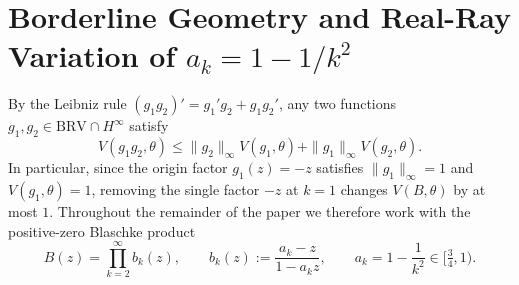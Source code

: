 \documentclass[11pt,reqno]{amsart}
\numberwithin{equation}{section}
\newcommand{\BRV}{\mathrm{BRV}}
\begin{document}
\section{Borderline Geometry and Real-Ray Variation of $a_k = 1 - 1/k^2$} \label{sec_borderline}

By the Leibniz rule $(g_1 g_2)' = g_1' g_2 + g_1 g_2'$, any two functions $g_1, g_2 \in \BRV \cap H^\infty$ satisfy
\begin{equation} \label{eq_brv_algebra}
  V(g_1 g_2, \theta) \le \|g_2\|_\infty V(g_1, \theta) + \|g_1\|_\infty V(g_2, \theta).
\end{equation}
In particular, since the origin factor $g_1(z) = -z$ satisfies $\|g_1\|_\infty = 1$ and $V(g_1, \theta) = 1$, removing the single factor $-z$ at $k = 1$ changes $V(B, \theta)$ by at most $1$. Throughout the remainder of the paper we therefore work with the positive-zero Blaschke product
\begin{equation} \label{eq_B_tail}
  B(z) = \prod_{k=2}^\infty b_k(z), \qquad b_k(z) := \frac{a_k - z}{1 - a_k z}, \qquad a_k = 1 - \frac{1}{k^2} \in \bigl[\tfrac{3}{4}, 1\bigr).
\end{equation}
\end{document}
